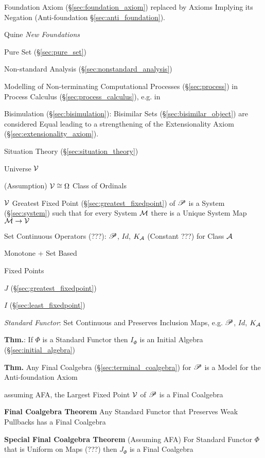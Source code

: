 \cite{aczel88}

Foundation Axiom (\S\ref{sec:foundation_axiom}) replaced by Axioms
Implying its Negation (Anti-foundation \S\ref{sec:anti_foundation}).

Quine \emph{New Foundations}

Pure Set (\S\ref{sec:pure_set})

Non-standard Analysis (\S\ref{sec:nonstandard_analysis})

Modelling of Non-terminating Computational Processes
(\S\ref{sec:process}) in Process Calculus
(\S\ref{sec:process_calculus}), e.g. in
\cite{abramsky-gay-nagarajan96}

Bisimulation (\S\ref{sec:bisimulation}): Bisimilar Sets
(\S\ref{sec:bisimilar_object}) are considered Equal leading to a
strengthening of the Extensionality Axiom
(\S\ref{sec:extensionality_axiom}).

Situation Theory (\S\ref{sec:situation_theory})

Universe $\mathcal{V}$

(Assumption) $\mathcal{V} \cong \Omega$ Class of Ordinals

$\mathcal{V}$ Greatest Fixed Point (\S\ref{sec:greatest_fixedpoint}) of
$\mathscr{P}$ is a System (\S\ref{sec:system}) such that for every System
$\mathcal{M}$ there is a Unique System Map $\mathcal{M} \rightarrow
\mathcal{V}$

Set Continuous Operators (???): $\mathscr{P}$, $Id$, $K_\mathcal{A}$ (Constant
???) for Class $\mathcal{A}$

Monotone + Set Based

Fixed Points

$J$ (\S\ref{sec:greatest_fixedpoint})

$I$ (\S\ref{sec:least_fixedpoint})

\emph{Standard Functor}: Set Continuous and Preserves Inclusion Maps,
e.g. $\mathscr{P}$, $Id$, $K_\mathcal{A}$

\textbf{Thm.}: If $\Phi$ is a Standard Functor then $I_\Phi$ is an
Initial Algebra (\S\ref{sec:initial_algebra})

\textbf{Thm.} Any Final Coalgebra (\S\ref{sec:terminal_coalgebra}) for
$\mathscr{P}$ is a Model for the Anti-foundation Axiom

assuming AFA, the Largest Fixed Point $\mathcal{V}$ of $\mathscr{P}$ is a Final
Coalgebra

\textbf{Final Coalgebra Theorem} Any Standard Functor that Preserves
Weak Pullbacks has a Final Coalgebra

\textbf{Special Final Coalgebra Theorem} (Assuming AFA) For Standard
Functor $\Phi$ that is Uniform on Maps (???) then $J_\Phi$ is a Final
Coalgebra

